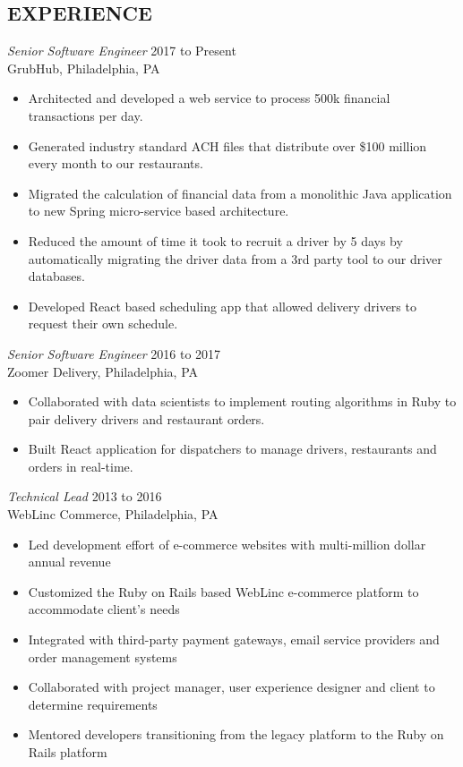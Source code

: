 \documentclass[line]{style}
\begin{document}
\newsectionwidth{0in}

\address{michaelcdalton@gmail.com}
\address{linkedin.com/in/michaelcdalton}

\begin{resume}

\section{EXPERIENCE}

{\sl Senior Software Engineer} \hfill 2017 to Present \\
GrubHub, Philadelphia, PA
\begin{itemize} \itemsep -2pt
\item Architected and developed a web service to process 500k financial transactions per day.
\item Generated industry standard ACH files that distribute over \$100 million every month to our restaurants.
\item Migrated the calculation of financial data from a monolithic Java application to new Spring micro-service based architecture.
\item Reduced the amount of time it took to recruit a driver by 5 days by automatically migrating the driver data from a 3rd party tool to our driver databases.
\item Developed React based scheduling app that allowed delivery drivers to request their own schedule.
\end{itemize}

{\sl Senior Software Engineer} \hfill 2016 to 2017 \\
Zoomer Delivery, Philadelphia, PA
\begin{itemize} \itemsep -2pt
\item Collaborated with data scientists to implement routing algorithms in Ruby to pair delivery drivers and restaurant orders.
\item Built React application for dispatchers to manage drivers, restaurants and orders in real-time.
\end{itemize}

{\sl Technical Lead} \hfill 2013 to 2016 \\
WebLinc Commerce, Philadelphia, PA
\begin{itemize} \itemsep -2pt
\item Led development effort of e-commerce websites with multi-million dollar annual revenue
\item Customized the Ruby on Rails based WebLinc e-commerce platform to accommodate client's needs
\item Integrated with third-party payment gateways, email service providers and order management systems
\item Collaborated with project manager, user experience designer and client to determine requirements
\item Mentored developers transitioning from the legacy platform to the Ruby on Rails platform
\end{itemize}


\end{resume}
\end{document}
